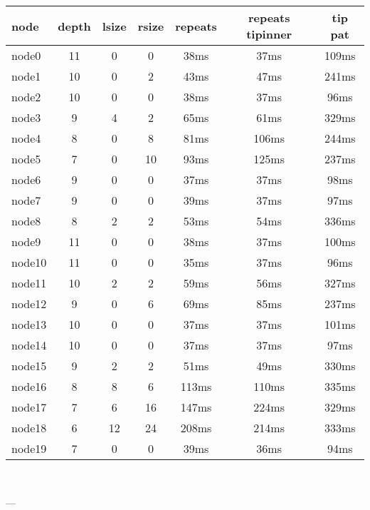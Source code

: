 \begin{tabular}{|l|c|c|c|c|c|c|}
\hline node & depth & lsize & rsize  & repeats & repeats tipinner & tip pat\\
    \hline node0 & 11 & 0 & 0 & 38ms & 37ms & 109ms\\
    \hline node1 & 10 & 0 & 2 & 43ms & 47ms & 241ms\\
    \hline node2 & 10 & 0 & 0 & 38ms & 37ms & 96ms\\
    \hline node3 & 9 & 4 & 2 & 65ms & 61ms & 329ms\\
    \hline node4 & 8 & 0 & 8 & 81ms & 106ms & 244ms\\
    \hline node5 & 7 & 0 & 10 & 93ms & 125ms & 237ms\\
    \hline node6 & 9 & 0 & 0 & 37ms & 37ms & 98ms\\
    \hline node7 & 9 & 0 & 0 & 39ms & 37ms & 97ms\\
    \hline node8 & 8 & 2 & 2 & 53ms & 54ms & 336ms\\
    \hline node9 & 11 & 0 & 0 & 38ms & 37ms & 100ms\\
    \hline node10 & 11 & 0 & 0 & 35ms & 37ms & 96ms\\
    \hline node11 & 10 & 2 & 2 & 59ms & 56ms & 327ms\\
    \hline node12 & 9 & 0 & 6 & 69ms & 85ms & 237ms\\
    \hline node13 & 10 & 0 & 0 & 37ms & 37ms & 101ms\\
    \hline node14 & 10 & 0 & 0 & 37ms & 37ms & 97ms\\
    \hline node15 & 9 & 2 & 2 & 51ms & 49ms & 330ms\\
    \hline node16 & 8 & 8 & 6 & 113ms & 110ms & 335ms\\
    \hline node17 & 7 & 6 & 16 & 147ms & 224ms & 329ms\\
    \hline node18 & 6 & 12 & 24 & 208ms & 214ms & 333ms\\
    \hline node19 & 7 & 0 & 0 & 39ms & 36ms & 94ms\\

\hline
\end{tabular} \

---


